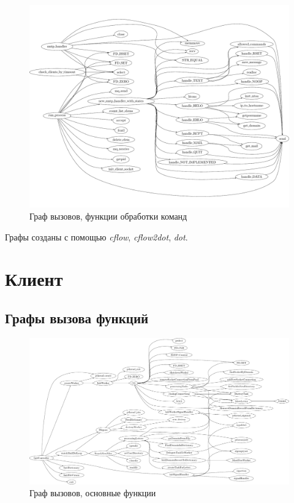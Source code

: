 \documentclass[a4paper,12pt]{report}
\begin{document}
\begin{figure}
\centering
\includegraphics[width=\textwidth]{include/scflow02_dot.pdf}
\caption{Граф вызовов, функции обработки команд}
\label{fig:scflow01}
\end{figure}

Графы созданы с помощью \textit{cflow}, \textit{cflow2dot}, \textit{dot}.


\section{Клиент}

\subsection{Графы вызова функций}

\begin{figure}
    \centering
    \includegraphics[width=\textwidth]{include/ccflow01_dot.pdf}
    \caption{Граф вызовов, основные функции}
    \label{fig:ccflow01}
\end{figure}
    
\end{document}
